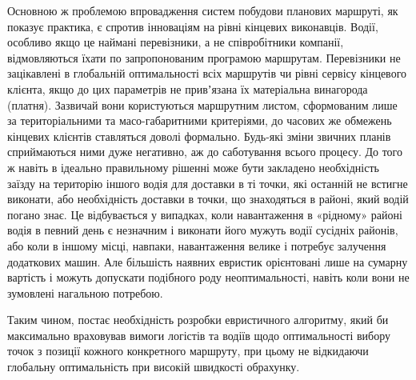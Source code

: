 Основною ж проблемою впровадження систем побудови планових маршруті, як показує практика, є спротив інноваціям на рівні кінцевих виконавців. Водії, особливо якщо це наймані перевізники, а не співробітники компанії, відмовляються їхати по запропонованим програмою маршрутам. Перевізники не зацікавлені в глобальній оптимальності всіх маршрутів чи рівні сервісу кінцевого клієнта, якщо до цих параметрів не привʼязана їх матеріальна винагорода (платня). Зазвичай вони користуються маршрутним листом, сформованим лише за територіальними та масо-габаритними критеріями, до часових же обмежень кінцевих клієнтів ставляться доволі формально. Будь-які зміни звичних планів сприймаються ними дуже негативно, аж до саботування всього процесу. До того ж навіть в ідеально правильному рішенні може бути закладено необхідність заїзду на територію іншого водія для доставки в ті точки, які останній не встигне виконати, або необхідність доставки в точки, що знаходяться в районі, який водій погано знає. Це відбувається у випадках, коли навантаження в «рідному» районі водія в певний день є незначним і виконати його мужуть водії сусідніх районів, або коли в іншому місці, навпаки, навантаження велике і потребує залучення додаткових машин. Але більшість наявних евристик орієнтовані лише на сумарну вартість і можуть допускати подібного роду неоптимальності, навіть коли вони не зумовлені нагальною потребою.

Таким чином, постає необхідність розробки евристичного алгоритму, який би максимально враховував вимоги логістів та водіїв щодо оптимальності вибору точок з позиції кожного конкретного маршруту, при цьому не відкидаючи глобальну оптимальність при високій швидкості обрахунку.

